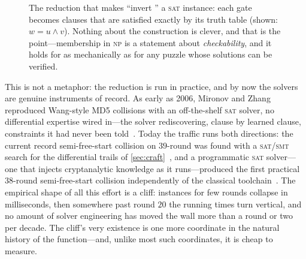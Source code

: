 \begin{figure}[ht]
  \centering
  \caption{The reduction that makes ``invert \SHA{}'' a \textsc{sat}
  instance: each gate becomes clauses that are satisfied exactly by its
  truth table (shown: $w = u \wedge v$). Nothing about the construction
  is clever, and that is the point---membership in \textsc{np} is a
  statement about \emph{checkability}, and it holds for \SHA{} as
  mechanically as for any puzzle whose solutions can be verified.}
  \label{fig:tseitin}
\end{figure}

This is not a metaphor: the reduction is run in practice, and by now the
solvers are genuine instruments of record. As early as 2006, Mironov and
Zhang reproduced Wang-style MD5 collisions with an off-the-shelf
\textsc{sat} solver, no differential expertise wired in---the solver
rediscovering, clause by learned clause, constraints it had never been
told~\citep{MironovZhang2006}. Today the traffic runs both directions:
the current record semi-free-start collision on $39$-round \SHA{} was
found with a \textsc{sat}/\textsc{smt} search for the differential
trails of \cref{sec:craft}~\citep{LiLiuWang2024}, and a programmatic
\textsc{sat} solver---one that injects cryptanalytic knowledge as it
runs---produced the first practical $38$-round semi-free-start collision
independently of the classical toolchain~\citep{AlamgirNejatiBright2024}.
The empirical shape of all this effort is a cliff: instances for few
rounds collapse in milliseconds, then somewhere past round $20$ the
running times turn vertical, and no amount of solver engineering has
moved the wall more than a round or two per decade. The cliff's very
existence is one more coordinate in the natural history of the
function---and, unlike most such coordinates, it is cheap to measure.


